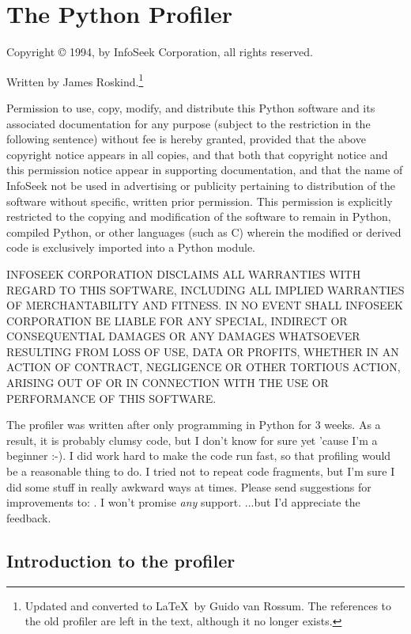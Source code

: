 \chapter{The Python Profiler \label{profile}}


Copyright \copyright{} 1994, by InfoSeek Corporation, all rights reserved.

Written by James Roskind.\footnote{
  Updated and converted to \LaTeX\ by Guido van Rossum.  The references to
  the old profiler are left in the text, although it no longer exists.}

Permission to use, copy, modify, and distribute this Python software
and its associated documentation for any purpose (subject to the
restriction in the following sentence) without fee is hereby granted,
provided that the above copyright notice appears in all copies, and
that both that copyright notice and this permission notice appear in
supporting documentation, and that the name of InfoSeek not be used in
advertising or publicity pertaining to distribution of the software
without specific, written prior permission.  This permission is
explicitly restricted to the copying and modification of the software
to remain in Python, compiled Python, or other languages (such as C)
wherein the modified or derived code is exclusively imported into a
Python module.

INFOSEEK CORPORATION DISCLAIMS ALL WARRANTIES WITH REGARD TO THIS
SOFTWARE, INCLUDING ALL IMPLIED WARRANTIES OF MERCHANTABILITY AND
FITNESS. IN NO EVENT SHALL INFOSEEK CORPORATION BE LIABLE FOR ANY
SPECIAL, INDIRECT OR CONSEQUENTIAL DAMAGES OR ANY DAMAGES WHATSOEVER
RESULTING FROM LOSS OF USE, DATA OR PROFITS, WHETHER IN AN ACTION OF
CONTRACT, NEGLIGENCE OR OTHER TORTIOUS ACTION, ARISING OUT OF OR IN
CONNECTION WITH THE USE OR PERFORMANCE OF THIS SOFTWARE.


The profiler was written after only programming in Python for 3 weeks.
As a result, it is probably clumsy code, but I don't know for sure yet
'cause I'm a beginner :-).  I did work hard to make the code run fast,
so that profiling would be a reasonable thing to do.  I tried not to
repeat code fragments, but I'm sure I did some stuff in really awkward
ways at times.  Please send suggestions for improvements to:
.  I won't promise \emph{any} support.  ...but
I'd appreciate the feedback.


\section{Introduction to the profiler}

